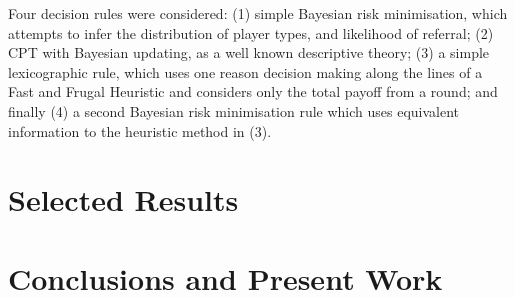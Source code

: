 \documentclass[twocolumn]{article}
\begin{document}
Four decision rules were considered: (1) simple Bayesian risk minimisation, which attempts to infer the distribution of player types, and likelihood of referral; (2) \ac{CPT} \citep{Tversky1992} with Bayesian updating, as a well known descriptive theory; (3) a simple lexicographic rule, which uses one reason decision making along the lines of a Fast and Frugal Heuristic \citep{Gigerenzer1996} and considers only the total payoff from a round; and finally (4) a second Bayesian risk minimisation rule which uses equivalent information to the heuristic method in (3).

\section{Selected Results}\label{results} %


\section{Conclusions and Present Work}\label{conc} %




\end{document}

